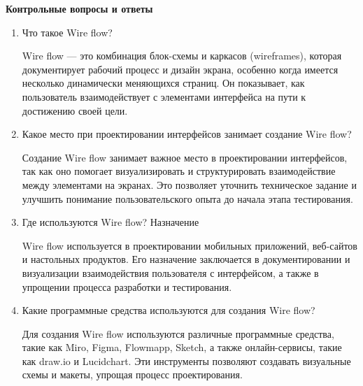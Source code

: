 \textbf{Контрольные вопросы и ответы}

\begin{enumerate}
    \item Что такое Wire flow?

Wire flow — это комбинация блок-схемы и каркасов (wireframes), которая документирует рабочий процесс и дизайн экрана, особенно когда имеется несколько динамически меняющихся страниц. Он показывает, как пользователь взаимодействует с элементами интерфейса на пути к достижению своей цели.
    \item Какое место при проектировании интерфейсов занимает создание Wire flow?

Создание Wire flow занимает важное место в проектировании интерфейсов, так как оно помогает визуализировать и структурировать взаимодействие между элементами на экранах. Это позволяет уточнить техническое задание и улучшить понимание пользовательского опыта до начала этапа тестирования.
    \item Где используются Wire flow? Назначение

Wire flow используется в проектировании мобильных приложений, веб-сайтов и настольных продуктов. Его назначение заключается в документировании и визуализации взаимодействия пользователя с интерфейсом, а также в упрощении процесса разработки и тестирования.
    \item Какие программные средства используются для создания Wire flow?

Для создания Wire flow используются различные программные средства, такие как Miro, Figma, Flowmapp, Sketch, а также онлайн-сервисы, такие как draw.io и Lucidchart. Эти инструменты позволяют создавать визуальные схемы и макеты, упрощая процесс проектирования.
\end{enumerate}


